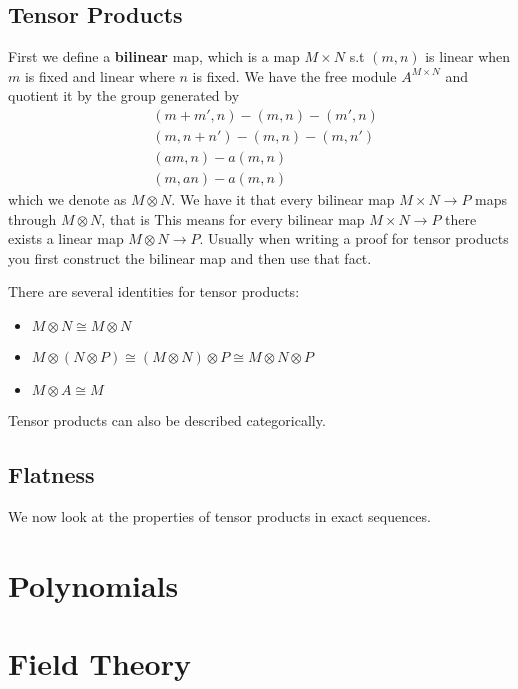 \documentclass[12pt]{book}
\begin{document}
 \section{Tensor Products}
 First we define a \textbf{bilinear} map, which is a map $M \times N$ s.t $(m,n)$ is linear when $m$ is fixed and linear where $n$ is fixed. We have the free module $A^{M \times N}$ and quotient it by the group generated by 
 \begin{align*}
 &(m+m',n)-(m,n)-(m',n) \\
 &(m,n+n')-(m,n)-(m,n')\\
 &(am,n)-a(m,n)\\
 &(m,an)-a(m,n)
 \end{align*}
 which we denote as $M \otimes N$. We have it that every bilinear map $M \times N \rightarrow P$ maps through $M \otimes N$, that is
 This means for every bilinear map $M \times N \rightarrow P$ there exists a linear map $M \otimes N \rightarrow P$. Usually when writing a proof for tensor products you first construct the bilinear map and then use that fact.
 
 There are several identities for tensor products:
 \begin{itemize}
 \item $M \otimes N \cong M \otimes N$
 \item $M \otimes (N \otimes P)\cong(M \otimes N) \otimes P \cong M \otimes N \otimes P$
 \item $M \otimes A \cong M$
 \end{itemize}
 
Tensor products can also be described categorically.
 
 
 \section{Flatness}
 We now look at the properties of tensor products in exact sequences.
 \chapter{Polynomials}
 
\chapter{Field Theory}
 
\end{document}
